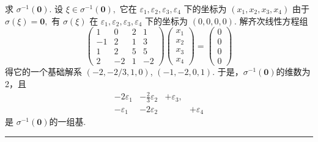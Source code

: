 \documentclass[13pt]{beamer}
\def\qed{\nopagebreak\hfill{\rule{4pt}{7pt}}\medbreak}
\def\0{\mathbf{0}}
\begin{document}
\begin{frame}
求 $\sigma^{-1}(\0)$.  设 $\xi \in \sigma^{-1}(\0),$ 它在 $\varepsilon_{1}, \varepsilon_{2}, \varepsilon_{3}, \varepsilon_{4}$
下的坐标为 $\left(x_{1}, x_{2}, x_{3}, x_{4}\right)$
由于 $\sigma(\xi)=\mathbf{0},$ 有 $\sigma(\xi)$ 在 $\varepsilon_{1}, \varepsilon_{2}, \varepsilon_{3}, \varepsilon_{4}$ 下的坐标为
$({0}, {0}, {0}, {0})$.
解齐次线性方程组
$$\left(\begin{array}{cccc}1 & 0 & 2 & 1 \\ -1 & 2 & 1 & 3 \\ 1 & 2 & 5 & 5 \\ 2 & -2 & 1 & -2\end{array}\right)\left(\begin{array}{l}x_{1} \\ x_{2} \\ x_{3} \\ x_{4}\end{array}\right)=\left(\begin{array}{l}0 \\ 0 \\ 0 \\ 0\end{array}\right)$$
得它的一个基础解系
$(-2,-2/3, 1,  0)$, $(-1, -2, 0, 1)$.
于是，$\sigma^{-1}(\0)$的维数为2，且
\[\begin{array}{rrrr}
-2 \varepsilon_{1}& -\frac{2}{3}\varepsilon_{2}& +\varepsilon_{3},& \\
- \varepsilon_{1} & -2 \varepsilon_{2}&&+  \varepsilon_{4}
\end{array}\]
是
$\sigma^{-1}(\0)$的一组基. \qed
\end{frame}
\end{document}
